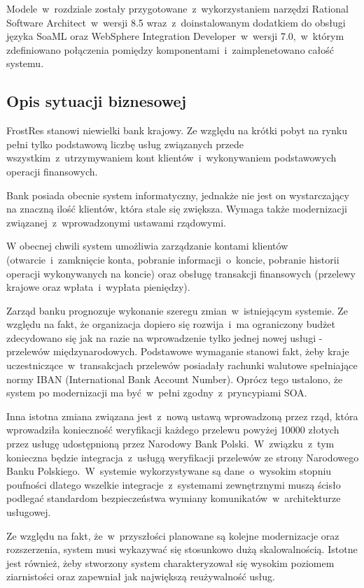 Modele~w~rozdziale zostały przygotowane~z~wykorzystaniem narzędzi Rational Software Architect~w~wersji 8.5 wraz~z~doinstalowanym dodatkiem do obsługi języka SoaML oraz WebSphere Integration Developer~w~wersji 7.0,~w~którym zdefiniowano połączenia pomiędzy komponentami~i~zaimplenetowano całość systemu.

\subsection{Opis sytuacji biznesowej}
FrostRes stanowi niewielki bank krajowy. Ze względu na krótki pobyt na rynku pełni tylko podstawową liczbę usług związanych przede wszystkim~z~utrzymywaniem kont klientów~i~wykonywaniem podstawowych operacji finansowych. 
 
Bank posiada obecnie system informatyczny, jednakże nie jest on wystarczający na znaczną ilość klientów, która stale się zwiększa. Wymaga także modernizacji związanej~z~wprowadzonymi ustawami rządowymi.  

W obecnej chwili system umożliwia zarządzanie kontami klientów (otwarcie~i~zamknięcie konta, pobranie informacji~o~koncie, pobranie historii operacji wykonywanych na koncie) oraz obsługę transakcji finansowych (przelewy krajowe oraz wpłata~i~wypłata pieniędzy). 

Zarząd banku prognozuje wykonanie szeregu zmian~w~istniejącym systemie. Ze względu na fakt, że organizacja dopiero się rozwija~i~ma ograniczony budżet zdecydowano się jak na razie na wprowadzenie tylko jednej nowej usługi - przelewów międzynarodowych. Podstawowe wymaganie stanowi fakt, żeby kraje uczestniczące~w~transakcjach przelewów posiadały rachunki walutowe spełniające normy IBAN (International Bank Account Number). Oprócz tego ustalono, że system po modernizacji ma być~w~pełni zgodny~z~pryncypiami SOA. 

Inna istotna zmiana związana jest~z~nową ustawą wprowadzoną przez rząd, która wprowadziła konieczność weryfikacji każdego przelewu powyżej 10000 złotych przez usługę udostępnioną przez Narodowy Bank Polski.~W~związku~z~tym konieczna będzie integracja~z~usługą weryfikacji przelewów ze strony Narodowego Banku Polskiego.~W~systemie wykorzystywane są dane~o~wysokim stopniu poufności dlatego wszelkie integracje~z~systemami zewnętrznymi muszą ścisło podlegać standardom bezpieczeństwa wymiany komunikatów~w~architekturze usługowej.

Ze względu na fakt, że~w~przyszłości planowane są kolejne modernizacje oraz rozszerzenia, system musi wykazywać się stosunkowo dużą skalowalnością. Istotne jest również, żeby stworzony system charakteryzował się wysokim poziomem ziarnistości oraz zapewniał jak największą reużywalność usług. 


